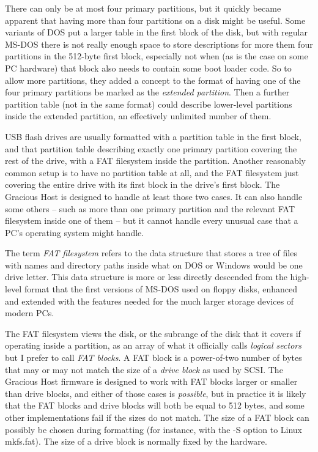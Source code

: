 There can only be at most four primary partitions, but it quickly became
apparent that having more than four partitions on a disk might be useful. 
Some variants of DOS put a larger table in the first block of the disk, but
with regular MS-DOS there is not really enough space to store descriptions
for more them four partitions in the 512-byte first block, especially not
when (as is the case on some PC hardware) that block also needs to contain
some boot loader code.  So to allow more partitions, they added a concept to
the format of having one of the four primary partitions be marked as the
\emph{extended partition}.  Then a further partition table (not in the same
format) could describe lower-level partitions inside the extended partition,
an effectively unlimited number of them.

USB flash drives are usually formatted with a partition table in the first
block, and that partition table describing exactly one primary partition
covering the rest of the drive, with a FAT filesystem inside the partition. 
Another reasonably common setup is to have no partition table at all, and
the FAT filesystem just covering the entire drive with its first block in
the drive's first block.  The Gracious Host is designed to handle at least
those two cases.  It can also handle some others -- such as more than one
primary partition and the relevant FAT filesystem inside one of them -- but
it cannot handle every unusual case that a PC's operating system might
handle.

The term \emph{FAT filesystem} refers to the data structure that stores a
tree of files with names and directory paths inside what on DOS or Windows
would be one drive letter.  This data structure is more or less directly
descended from the high-level format that the first versions of MS-DOS used
on floppy disks, enhanced and extended with the features needed for the much
larger storage devices of modern PCs.

The FAT filesystem views the disk, or the subrange of the disk that it
covers if operating inside a partition, as an array of what it officially
calls \emph{logical sectors} but I prefer to call \emph{FAT blocks}.  A FAT
block is a power-of-two number of bytes that may or may not match the size
of a \emph{drive block} as used by SCSI.  The Gracious Host firmware is
designed to work with FAT blocks larger or smaller than drive blocks, and
either of those cases is \emph{possible}, but in practice it is likely that
the FAT blocks and drive blocks will both be equal to 512 bytes, and some
other implementations fail if the sizes do not match.  The size of a FAT
block can possibly be chosen during formatting (for instance, with the -S
option to Linux mkfs.fat).  The size of a drive block is normally fixed by
the hardware.

